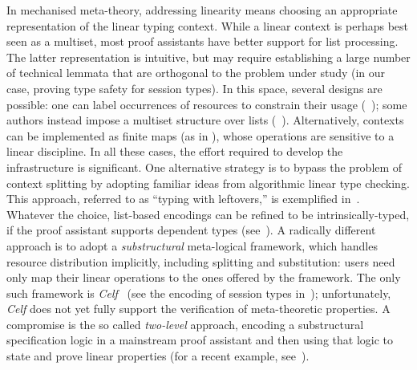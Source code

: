 \documentclass[runningheads]{llncs}
\begin{document}
In mechanised meta-theory, addressing linearity means choosing an appropriate
representation of the linear typing context.  While a linear context is perhaps
best seen as a multiset, most proof assistants have better support for list
processing.  The latter representation is intuitive, but may require
establishing a large number of technical lemmata that are orthogonal to the
problem under study (in our case, proving type safety for
session types).  In this space, several designs are possible: one can label
occurrences of resources to constrain their usage (\eg~\cite{CicconeP20}); some
authors instead impose a multiset structure over lists
(\eg~\cite{Danielsson12,ChaudhuriLR19}). Alternatively, contexts can be
implemented as finite maps (as in \cite{Castro2020}), whose operations are
sensitive to a linear discipline. In all these cases, the effort required to
develop the infrastructure is significant.
%
One alternative strategy is to bypass the problem of context splitting
by adopting familiar ideas from algorithmic linear type checking. This
approach, referred to as ``typing with leftovers,'' is exemplified
in~\cite{DBLP:conf/forte/ZalakainD21}.  Whatever the choice,
list-based encodings can be refined to be intrinsically-typed, if the
proof assistant supports dependent types
(see~\cite{Thiemann2019,CicconeP20,RouvoetPKV20}).
%
A radically different approach is to adopt a \emph{substructural}
meta-logical framework, which handles resource
distribution implicitly, including splitting and
substitution: users need only map their linear operations to the
ones offered by the framework.  The only such framework is
\emph{Celf}~\cite{Schack-Nielsen:IJCAR08} (see the encoding of session
types in~\cite{Bock2016}); unfortunately, \emph{Celf} does not yet
fully support the verification of meta-theoretic properties.  A
compromise is the so called \emph{two-level} approach, \ie encoding a
substructural specification logic in a mainstream proof assistant and
then using that logic to state and prove linear properties (for a
recent example, see~\cite{Felty:MSCS21}).
\end{document}
